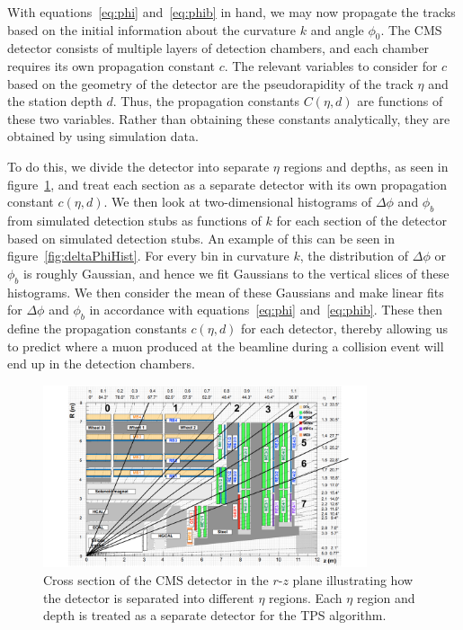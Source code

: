 With equations~\ref{eq:phi} and~\ref{eq:phib} in hand, we may now propagate the tracks based on the initial information about the curvature $k$ and angle $\phi_0$.
The CMS detector consists of multiple layers of detection chambers, and each chamber requires its own propagation constant $c$.
The relevant variables to consider for $c$ based on the geometry of the detector are the pseudorapidity of the track $\eta$ and the station depth $d$.
Thus, the propagation constants $C(\eta,d)$ are functions of these two variables.
Rather than obtaining these constants analytically, they are obtained by using simulation data. %

To do this, we divide the detector into separate $\eta$ regions and depths, as seen in figure~\ref{fig:barrelEta}, and treat each section as a separate detector with its own propagation constant $c(\eta,d)$.
We then look at two-dimensional histograms of $\Delta\phi$ and $\phi_b$ from simulated detection stubs as functions of $k$ for each section of the detector based on simulated detection stubs.
An example of this can be seen in figure~\ref{fig:deltaPhiHist}.
For every bin in curvature $k$, the distribution of $\Delta\phi$ or $\phi_b$ is roughly Gaussian, and hence we fit Gaussians to the vertical slices of these histograms.
We then consider the mean of these Gaussians and make linear fits for $\Delta\phi$ and $\phi_b$ in accordance with equations~\ref{eq:phi} and~\ref{eq:phib}.
These then define the propagation constants $c(\eta,d)$ for each detector, thereby allowing us to predict where a muon produced at the beamline during a collision event will end up in the detection chambers.

\begin{figure}[htbp]
  \centering
  \includegraphics[width=0.85\textwidth]{fig/TPS/barrelEta.pdf}
  \caption{Cross section of the CMS detector in the $r$-$z$ plane illustrating how the detector is separated into different $\eta$ regions. Each $\eta$ region and depth is treated as a separate detector for the TPS algorithm.}
  \label{fig:barrelEta}
\end{figure}

